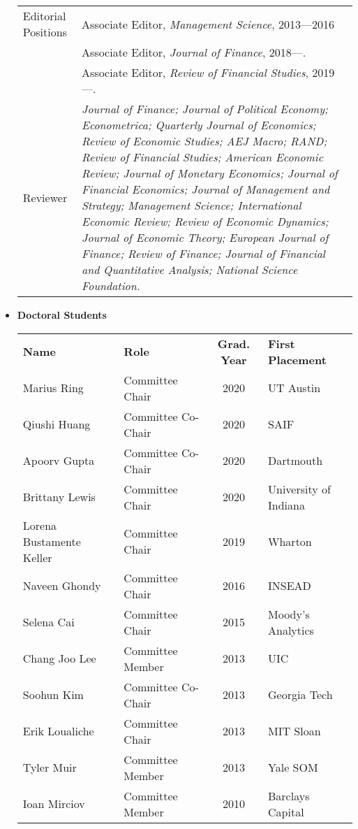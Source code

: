 \documentclass[11pt,letterpaper,serif,overlapped]{res}
\begin{document}
\begin{resume}
\begin{itemize}
\begin{longtable}{lp{11.5cm}}
Editorial Positions & Associate Editor, \emph{Management Science}, 2013---2016\\
  &Associate Editor, \emph{Journal of Finance}, 2018---.\\
  &Associate Editor, \emph{Review of Financial Studies}, 2019---.\\[0.2cm]

Reviewer&
\emph{Journal of Finance; Journal of Political Economy; Econometrica; Quarterly Journal of Economics; Review of Economic Studies; AEJ Macro; RAND;  Review of Financial Studies; American Economic Review;  Journal of Monetary Economics; Journal of Financial Economics; Journal of Management and Strategy; Management Science;  International Economic Review; Review of Economic Dynamics;   Journal of Economic Theory;   European Journal of Finance;   Review of Finance; Journal of Financial and Quantitative Analysis; National Science Foundation.}\\[0.2cm]

 \end{longtable}

\vspace{0.5cm}

\item \textbf{Doctoral Students}\\
\begin{longtable}{llcl}
\textbf{Name} & \textbf{Role} & \textbf{Grad. Year }& \textbf{First Placement}\\
Marius Ring &   Committee Chair & 2020 & UT Austin \\
Qiushi Huang & Committee Co-Chair & 2020 & SAIF\\
Apoorv Gupta  & Committee Co-Chair & 2020 & Dartmouth\\
Brittany Lewis  &Committee Chair & 2020 & University of Indiana  \\
Lorena Bustamente Keller & Committee Chair & 2019& Wharton \\
Naveen Ghondy  &  Committee Chair &2016 & INSEAD \\
Selena Cai  &  Committee Chair &2015 & Moody's Analytics\\
Chang Joo Lee   &  Committee Member &2013 & UIC \\
Soohun Kim   &  Committee  Co-Chair  &2013 & Georgia Tech \\
Erik Loualiche & Committee  Chair&2013    & MIT Sloan \\
Tyler Muir&   Committee Member  &2013& Yale  SOM\\
Ioan Mirciov  & Committee Member&2010 & Barclays Capital\\


\end{longtable}



\end{itemize}





\end{resume}
\end{document}

